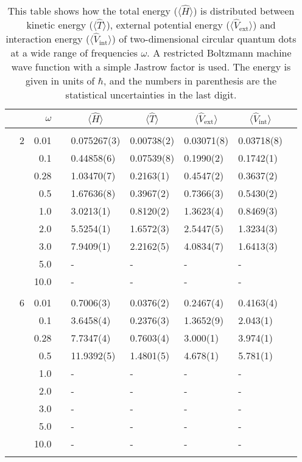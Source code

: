 \begin{table}[H]
	\caption{This table shows how the total energy ($\langle\hat{H}\rangle$) is distributed between kinetic energy ($\langle\hat{T}\rangle$), external potential energy ($\langle\hat{V}_{\text{ext}}\rangle$) and interaction energy ($\langle\hat{V}_{\text{int}}\rangle$) of two-dimensional circular quantum dots at a wide range of frequencies $\omega$. A restricted Boltzmann machine wave function with a simple Jastrow factor is used. The energy is given in units of $\hbar$, and the numbers in parenthesis are the statistical uncertainties in the last digit.}
	\label{tab:splitfrequencyQDRBMSJ}
	\begin{tabularx}{\textwidth}{R{1cm}rrcR{2.3cm}R{2.3cm}R{2.3cm}R{2.3cm}R{1cm}} \hline\hline
		&\makecell{\\ \phantom{$N$} \\ \phantom{=}} & $\omega$ &&  &  &  &  & \\ \hline \\
		&2 & 0.01 && 0.075267(3) & 0.00738(2) & 0.03071(8) & 0.03718(8) \\
		&& 0.1 && 0.44858(6) & 0.07539(8) & 0.1990(2) & 0.1742(1) \\
		&& 0.28 && 1.03470(7) & 0.2163(1) & 0.4547(2) & 0.3637(2) \\
		&& 0.5 && 1.67636(8) & 0.3967(2) & 0.7366(3) & 0.5430(2)\\
		&& 1.0 && 3.0213(1) & 0.8120(2) & 1.3623(4) & 0.8469(3)\\
		&& 2.0 && 5.5254(1) & 1.6572(3) & 2.5447(5) & 1.3234(3) \\
		&& 3.0 && 7.9409(1) & 2.2162(5) & 4.0834(7) & 1.6413(3) \\ 
		&& 5.0 && - & - & - & -\\
		&& 10.0 && - & - & - & -\\
		\hdashline \\
		
		&6 & 0.01 && 0.7006(3) & 0.0376(2) & 0.2467(4) & 0.4163(4) \\
		&& 0.1 && 3.6458(4) & 0.2376(3) & 1.3652(9) & 2.043(1) \\
		&& 0.28 && 7.7347(4) & 0.7603(4) & 3.000(1) & 3.974(1) \\
		&& 0.5 && 11.9392(5) & 1.4801(5) & 4.678(1) & 5.781(1) \\
		&& 1.0 && - & - & - & - \\
		&& 2.0 && - & - & - & -\\
		&& 3.0 && - & - & - & - \\ 
		&& 5.0 && - & - & - & -\\
		&& 10.0 && - & - & - & -\\
		\hdashline \\
		

\end{tabularx}
\end{table}
